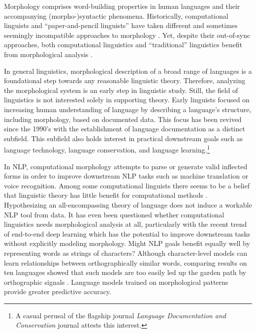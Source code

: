 \documentclass[12pt]{article}
\begin{document}
Morphology comprises word-building properties in human languages and their accompanying (morpho-)syntactic phenomena. Historically, computational linguists and ``paper-and-pencil linguists'' have taken different and sometimes seemingly incompatible approaches to morphology \cite{karttunen_2005}.  Yet, despite their out-of-sync approaches, both computational linguistics and ``traditional'' linguistics benefit from morphological analysis \cite[p. 165]{cotterell_labeled_2015}. 

In general linguistics, morphological description of a broad range of languages is a foundational step towards any reasonable linguistic theory. Therefore, analyzing the morphological system is an early step in linguistic study. Still, the field of linguistics is not interested solely in supporting theory. Early linguists focused on increasing human understanding of language by describing a language's structure, including morphology, based on documented data. This focus has been revived since the 1990's with the establishment of language documentation as a distinct subfield. This subfield also holds interest in practical downstream goals such as language technology, language conservation, and language learning.\footnote{A casual perusal of the flagship journal \textit{Language Documentation and Conservation} journal attests this interest.}

In NLP, computational morphology attempts to parse or generate valid inflected forms in order to improve downstream NLP tasks such as machine translation or voice recognition. Among some computational linguists there seems to be a belief that linguistic theory has little benefit for computational methods \cite{goldsmith_computational_2017}. Hypothesizing an all-encompassing theory of language does not induce a workable NLP tool from data. It has even been questioned whether computational linguistics needs morphological analysis at all, particularly with the recent trend of end-to-end deep learning which has the potential to improve downstream tasks without explicitly modeling morphology. Might NLP goals benefit equally well by representing words as strings of characters? Although character-level models can learn relationships between orthographically similar words, comparing results on ten languages showed that such models are too easily led up the garden path by orthographic signals \cite{vania_characters_2017}. Language models trained on morphological patterns provide greater predictive accuracy.  
\end{document}
